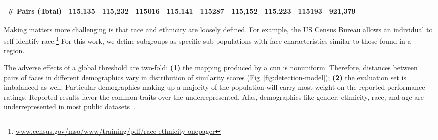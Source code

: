 \begin{table}[!t]
{{\begin{tabular}{r c c c c c c c c l}
        \# Pairs (Total) & 115,135 & 115,232    &115016 &115,141 & 115287  & 115,152  &  115,223& 115193 & 921,379\\ %
        
        \bottomrule
    \end{tabular}}
    }
\end{table}

    
    Making matters more challenging is that race and ethnicity are loosely defined. For example, the US Census Bureau allows an individual to self-identify race.\footnote{\scriptsize\href{https://www.census.gov/mso/www/training/pdf/race-ethnicity-onepager.pdf}{www.census.gov/mso/www/training/pdf/race-ethnicity-onepager}} For this work, we define subgroups as specific sub-populations with face characteristics similar to those found in a region. 
    
    
    The adverse effects of a global threshold are two-fold: \textbf{(1)} the mapping produced by a \gls{cnn} is nonuniform. Therefore, distances between pairs of faces in different demographics vary in distribution of similarity scores (Fig~\ref{fig:detection-model}); \textbf{(2)} the evaluation set is imbalanced as well. Particular demographics making up a majority of the population will carry most weight on the reported performance ratings. Reported results favor the common traits over the underrepresented. Alas, demographics like gender, ethnicity, race, and age are underrepresented in most public datasets~\cite{merler2019diversity, wang2018racial}. 
    
